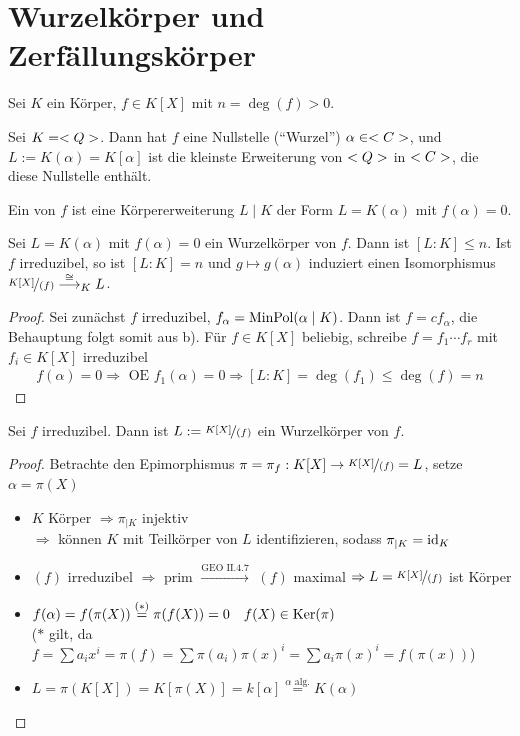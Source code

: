 \section{Wurzelkörper und Zerfällungskörper}
Sei $K$ ein Körper, $f \in K[X]$ mit $n = \deg(f) > 0$.
\begin{example}
	Sei $K=<Q>$. Dann hat $f$ eine Nullstelle (``Wurzel'') $\alpha \in <C>$, und $L:= K(\alpha) = K[\alpha]$ ist die kleinste Erweiterung von $<Q>$ in $<C>$, die diese Nullstelle enthält.
\end{example}
\begin{definition}[Wurzelkörper]
	Ein  von $f$ ist eine Körpererweiterung $L \mid K$ der Form $L = K(\alpha)$ mit $f(\alpha) = 0$.
\end{definition}
\begin{lemma}
	Sei $L = K(\alpha)$ mit $f(\alpha) = 0$ ein Wurzelkörper von $f$. Dann ist $[L:K] \le n$. Ist $f$ irreduzibel, so ist $[L:K] = n$ und $g \mapsto g(\alpha)$ induziert einen Isomorphismus $\lnkset{K[X]}{(f)} \overset{\cong}{\longrightarrow}_K L$.
\end{lemma}
\begin{proof} %
	Sei zunächst $f$ irreduzibel, $f_{\alpha} = \operatorname{MinPol}(\alpha \mid K)$. Dann ist $f = cf_{\alpha}$, die Behauptung folgt somit aus b). Für $f \in K[X]$ beliebig, schreibe $f = f_1\cdots f_r$ mit $f_i \in K[X]$ irreduzibel
	\begin{align*}
		f(\alpha) = 0 \Rightarrow \text{ OE } f_1(\alpha) = 0 \Rightarrow [L:K] = \deg(f_1) \le \deg(f) = n %
	\end{align*}
\end{proof}
\begin{lemma}
	Sei $f$ irreduzibel. Dann ist $L := \lnkset{K[X]}{(f)}$ ein Wurzelkörper von $f$.
\end{lemma}
\begin{proof}
	Betrachte den Epimorphismus $\pi = \pi_f: K[X] \to \lnkset{K[X]}{(f)} = L$, setze $\alpha = \pi(X)$
	\begin{itemize}
		\item $K$ Körper $\Rightarrow \pi_{\mid K}$ injektiv\\
		$\Rightarrow$ können $K$ mit Teilkörper von $L$ identifizieren, sodass $\pi_{\mid K} = \operatorname{id}_K$
		\item $(f)$ irreduzibel $\Rightarrow$ prim $\xrightarrow{\text{GEO II.4.7}}$ $(f)$ maximal $\Rightarrow L = \lnkset{K[X]}{(f)}$ ist Körper
		\item $f(\alpha) = f(\pi(X)) \overset{(\ast)}{=} \pi(f(X)) = 0 \quad f(X) \in \operatorname{Ker}(\pi)$\\
		($\ast$ gilt, da $f = \sum a_i x^i = \pi(f) = \sum \pi(a_i)\pi(x)^i = \sum a_i \pi(x)^i = f(\pi(x))$)
		\item $L=\pi(K[X]) = K[\pi(X)] = k[\alpha] \overset{\alpha \text{ alg.}}{=} K(\alpha)$
	\end{itemize}
\end{proof}
